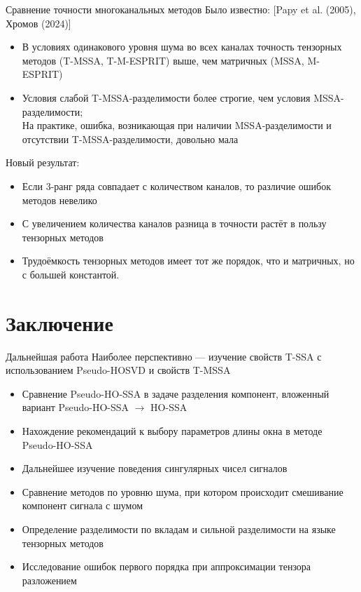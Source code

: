 \documentclass[pdf, unicode, 10pt, notheorems, handout]{beamer}
\newcommand{\bluetext}[1]{{\usebeamercolor[fg]{bluetext_color}#1}}
\begin{document}
\begin{frame}{Сравнение точности многоканальных методов}
  \bluetext{Было известно:} [Papy et al. (2005), Хромов (2024)]
  \begin{itemize}
    \item В условиях одинакового уровня шума во всех каналах точность
      тензорных методов (T-MSSA, T-M-ESPRIT) выше, чем матричных (MSSA,
      M-ESPRIT)\smallskip
    \item Условия слабой T-MSSA-разделимости более строгие, чем
      условия MSSA-разделимости;\\
      На практике, ошибка, возникающая при наличии
      MSSA-разделимости и отсутствии T-MSSA-разделимости, довольно мала
  \end{itemize}\medskip

  \bluetext{Новый результат:}
  \begin{itemize}
    \item Если 3-ранг ряда совпадает с количеством каналов, то
      различие ошибок методов невелико\smallskip
    \item С увеличением количества каналов разница в точности
      растёт в пользу тензорных методов\smallskip
    \item Трудоёмкость тензорных методов имеет тот же порядок, что и
      матричных, но с большей константой.
  \end{itemize}
\end{frame}

\section{Заключение}
\begin{frame}{Дальнейшая работа}
  Наиболее перспективно --- изучение свойств T-SSA с использованием
  Pseudo-HOSVD и свойств T-MSSA\bigskip
  \begin{itemize}
    \item Сравнение Pseudo-HO-SSA в задаче разделения компонент,
      вложенный вариант Pseudo-HO-SSA $\rightarrow$ HO-SSA\medskip
    \item Нахождение рекомендаций к выбору параметров длины окна в
      методе Pseudo-HO-SSA\medskip
    \item Дальнейшее изучение поведения сингулярных чисел сигналов\medskip
    \item Сравнение методов по уровню шума, при котором
      происходит смешивание компонент сигнала с шумом\medskip
    \item Определение разделимости по вкладам и сильной
      разделимости на языке тензорных методов\medskip
    \item Исследование ошибок первого порядка при
      аппроксимации тензора разложением\medskip
  \end{itemize}
\end{frame}
\end{document}
